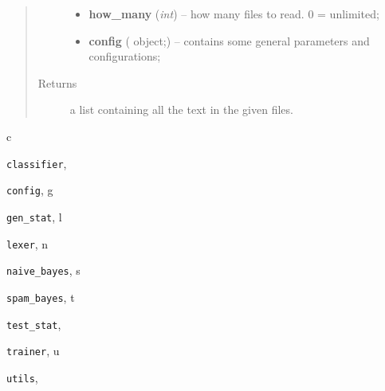 \documentclass[letterpaper,10pt,english]{sphinxmanual}
\begin{document}
\begin{fulllineitems}
\begin{fulllineitems}
\begin{quote}
\begin{description}
\begin{itemize}
\item {} 
\textbf{how\_many} (\emph{int}) -- how many files to read. 0 = unlimited;

\item {} 
\textbf{config} ({\hyperref[index:config.Config]{}} object;) -- contains some general parameters and configurations;

\end{itemize}

\item[{Returns}] \leavevmode
a list containing all the text in the given files.

\end{description}\end{quote}

\end{fulllineitems}


\end{fulllineitems}



\renewcommand{\indexname}{Python Module Index}
\begin{theindex}
\def\bigletter#1{{\Large\sffamily#1}\nopagebreak\vspace{1mm}}
\bigletter{c}
\item {\texttt{classifier}}, \pageref{index:module-classifier}
\item {\texttt{config}}, \pageref{index:module-config}
\indexspace
\bigletter{g}
\item {\texttt{gen\_stat}}, \pageref{index:module-gen_stat}
\indexspace
\bigletter{l}
\item {\texttt{lexer}}, \pageref{index:module-lexer}
\indexspace
\bigletter{n}
\item {\texttt{naive\_bayes}}, \pageref{index:module-naive_bayes}
\indexspace
\bigletter{s}
\item {\texttt{spam\_bayes}}, \pageref{index:module-spam_bayes}
\indexspace
\bigletter{t}
\item {\texttt{test\_stat}}, \pageref{index:module-test_stat}
\item {\texttt{trainer}}, \pageref{index:module-trainer}
\indexspace
\bigletter{u}
\item {\texttt{utils}}, \pageref{index:module-utils}
\end{theindex}

\renewcommand{\indexname}{Index}
\printindex
\end{document}
